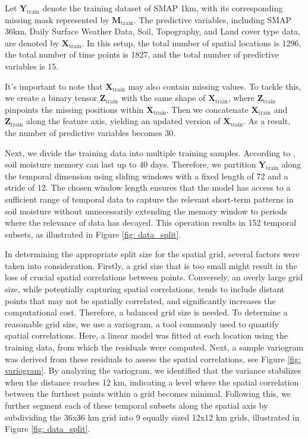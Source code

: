 \documentclass[11pt]{article}
\begin{document}
Let $\boldsymbol{Y}_{\text{train}}$ denote the training dataset of SMAP 1km, with its corresponding missing mask represented by $\boldsymbol{M}_{\text{train}}$. The predictive variables, including SMAP 36km, Daily Surface Weather Data, Soil, Topography, and Land cover type data, are denoted by $\boldsymbol{X}_{\text{train}}$. In this setup, the total number of spatial locations is 1296, the total number of time points is 1827, and the total number of predictive variables is 15.


It's important to note that $\boldsymbol{X}_{\text{train}}$ may also contain missing values. To tackle this, we create a binary tensor $\boldsymbol{Z}_{\text{train}}$ with the same shape of $\boldsymbol{X}_{\text{train}}$, where $\boldsymbol{Z}_{\text{train}}$ pinpoints the missing positions within $\boldsymbol{X}_{\text{train}}$. Then we concatenate $\boldsymbol{X}_{\text{train}}$ and $\boldsymbol{Z}_{\text{train}}$ along the feature axis, yielding an updated version of $\boldsymbol{X}_{\text{train}}$. As a result, the number of predictive variables becomes 30.


Next, we divide the training data into multiple training samples. According to \citet{orth2012analysis}, soil moisture memory can last up to 40 days. Therefore, we partition $\boldsymbol{Y}_{\text{train}}$ along the temporal dimension using sliding windows with a fixed length of 72 and a stride of 12.  The chosen window length ensures that the model has access to a sufficient range of temporal data to capture the relevant short-term patterns in soil moisture without unnecessarily extending the memory window to periods where the relevance of data has decayed. This operation results in 152 temporal subsets, as illustrated in Figure \ref{fig: data_split}.

In determining the appropriate split size for the spatial grid, several factors were taken into consideration. Firstly, a grid size that is too small might result in the loss of crucial spatial correlations between points. Conversely, an overly large grid size, while potentially capturing spatial correlations, tends to include distant points that may not be spatially correlated, and significantly increases the computational cost. Therefore, a balanced grid size is needed. To determine a reasonable grid size, we use a variogram, a tool commonly used to quantify spatial correlations. Here, a linear model was fitted at each location using the training data, from which the residuals were computed. Next, a sample variogram was derived from these residuals to assess the spatial correlations, see Figure \ref{fig: variogram}. By analyzing the variogram, we identified that the variance stabilizes when the distance reaches 12 km, indicating a level where the spatial correlation between the furthest points within a grid becomes minimal. Following this, we further segment each of these temporal subsets along the spatial axis by subdividing the 36x36 km grid into 9 equally sized 12x12 km grids, illustrated in Figure \ref{fig: data_split}. 
\end{document}
